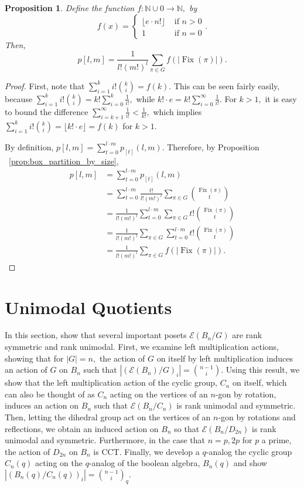 \documentclass[10 pt]{amsart}
\theoremstyle{plain}
\newtheorem{prop}[thm]{Proposition}
\theoremstyle{definition}
\theoremstyle{remark}
\numberwithin{equation}{section}
\newcommand\BN{{\mathbb N}}
\def\Fix{\operatorname{Fix}}
\begin{document}
\begin{prop}
\label{prop:all_box_partitions}
Define the function $f:\BN \cup 0 \rightarrow \BN,$ by $$f(x) = \begin{cases} \lfloor e\cdot n!\rfloor &\text{ if } n > 0 \\ 1 &\text{ if } n = 0\end{cases}.$$
Then, $$p[l,m] = \frac 1 {l!(m!)^l}\sum_{\pi \in G} f(|\Fix(\pi)|).$$
\end{prop}
\begin{proof}
First, note that $\sum_{i=1}^k i! \binom k i = f(k).$ This can be seen fairly easily, because $\sum_{i=1}^k i! \binom k i = k!\sum_{i=0}^k \frac 1 {i!},$ while $k! \cdot e = k!\sum_{i=0}^\infty \frac 1 {i!}.$ For $k > 1,$ it is easy to bound the difference $\sum_{i=k+1}^\infty \frac 1 {i!} < \frac 1 {k!},$ which implies   $\sum_{i=1}^k i! \binom k i  = \lfloor k! \cdot e \rfloor = f(k)$ for $k > 1.$

By definition, $p[l,m] = \sum_{t = 0}^{l\cdot m} p_{[t]}(l,m)$. Therefore, by Proposition ~\ref{prop:box_partition_by_size},
\begin{align*}
p[l,m] &= \sum_{t = 0}^{l\cdot m} p_{[t]}(l,m)\\
&=\sum_{t = 0}^{l\cdot m}\frac {t!}{l!(m!)^l}\sum_{\pi \in G} \binom {\Fix(\pi)} t\\
&= \frac {1}{l!(m!)^l}\sum_{t = 0}^{l\cdot m}\sum_{\pi \in G} t!\binom {\Fix(\pi)} t\\
&=  \frac {1}{l!(m!)^l}\sum_{\pi \in G}\sum_{t = 0}^{l\cdot m} t!\binom {\Fix(\pi)} t\\
&= \frac {1}{l!(m!)^l}\sum_{\pi \in G} f(|\Fix(\pi)|).
\end{align*}
\end{proof}




\section{Unimodal Quotients}
\label{sec:unimodal}

In this section, show that several important posets $\mathcal E(B_n/G)$ are rank symmetric and rank unimodal. First, we examine left multiplication actions, showing that for $|G| = n,$ the action of $G$ on itself by left multiplication induces an action of $G$ on $B_n$ such that $|(\mathcal E(B_n)/G)_i| = \binom {n-1} i.$ Using this result, we show that the left multiplication action of the cyclic group, $C_n$ on itself, which can also be thought of as $C_n$ acting on the vertices of an $n$-gon by rotation, induces an action on $B_n$ such that $\mathcal E(B_n/C_n)$ is rank unimodal and symmetric. Then, letting the dihedral group act on the vertices of an $n$-gon by rotations and reflections, we obtain an induced action on $B_n$ so that $\mathcal E(B_n/D_{2n})$ is rank unimodal and symmetric. Furthermore, in the case that $n = p,2p$ for $p$ a prime, the action of $D_{2n}$ on $B_n$ is CCT. Finally, we develop a $q$-analog the cyclic group $C_n(q)$ acting on the $q$-analog of the boolean algebra, $B_n(q)$ and show $|(B_n(q)/C_n(q))_i| = \binom {n-1} i _q.$
\end{document}
